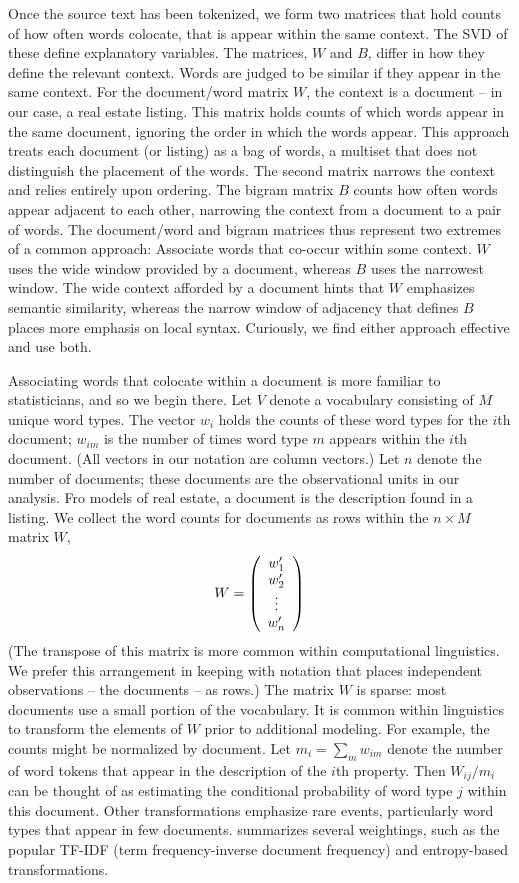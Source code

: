 \documentclass[12pt]{article}
\begin{document}
Once the source text has been tokenized, we form two matrices that hold counts of how often words colocate, that is appear within the same context.  The SVD of these define explanatory variables.  The matrices, $W$ and $B$,  differ in how they define the relevant context. Words are judged to be similar if they appear in the same context.  For the document/word matrix $W$, the context is a document -- in our case, a real estate listing.  This matrix holds counts of which words appear in the same document, ignoring the order in which the words appear. This approach treats each document (or listing) as a bag of words, a multiset that does not distinguish the placement of the words.  The second matrix narrows the context and relies entirely upon ordering.  The bigram matrix $B$ counts how often words  appear adjacent to each other, narrowing the context from a document to a pair of words.  The document/word and bigram matrices thus represent two extremes of a common approach:  Associate words that co-occur within some context.  $W$ uses the wide window provided by a document, whereas $B$ uses the narrowest window. The wide context afforded by a document hints that $W$ emphasizes semantic similarity, whereas the narrow window of adjacency that defines $B$ places more emphasis on local syntax.  Curiously, we find either approach effective and use both.
 
 
Associating words that colocate within a document is more familiar to statisticians, and so we begin there.  Let $V$ denote a vocabulary consisting of $M$ unique word types.  The vector $w_i$ holds the counts of these word types for the $i$th document; $w_{im}$ is the number of times word type $m$ appears within the $i$th document.  (All vectors in our notation are column vectors.)  Let $n$ denote the number of documents; these documents are the observational units in our analysis.  Fro models of real estate, a document is the description found in a listing.  We collect the word counts for documents as rows within the $n \times M$ matrix $W$,
 \begin{displaymath}
    W = \left( \begin{array}{c}
                 w_1' \cr w_2' \cr \vdots \cr w_n'
        \end{array} \right)
 \end{displaymath}
 (The  transpose of this matrix is more common within computational linguistics. We prefer this arrangement in keeping with notation that places independent observations -- the documents -- as rows.)  The matrix $W$ is sparse: most documents use a small portion of the  vocabulary.   It is common within linguistics to transform the elements of $W$ prior to additional modeling.   For example, the counts might be normalized by document. Let $m_i = \sum_m w_{im}$ denote the number of word tokens that appear in the description of the $i$th property.  Then $W_{ij}/m_i$ can be thought of as estimating the conditional probability of word type $j$ within this document.  Other transformations emphasize rare events, particularly word types that appear in few documents.  \citet{turney10} summarizes several weightings, such as the popular TF-IDF (term frequency-inverse document frequency) and entropy-based transformations.  
 
\end{document}
